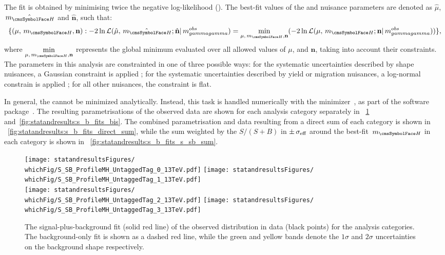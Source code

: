 The fit is obtained by minimising twice the negative log-likelihood (\NLL). 
The best-fit values of the \POI\s and nuisance parameters are denoted as $\hat{\mu}$, $\hat{\mH}$ and $\hat{\mathbf{n}}$, such that:
\begin{equation}
\{ (\mu, \mH, \mathbf{n}) : -2 \ln \mathcal{L}(\hat{\mu}, \hat{\mH} ;\hat{\mathbf{n}}| \mgg^{obs}) = \min _{\mu,\mH , \mathbf{n}}(-2 \ln \mathcal{L}(\mu, \mH; \mathbf{n}| \mgg^{obs})) \},
\end{equation}
where $\displaystyle\min_{ \mu, \mH ,\mathbf{n}}$ represents the global minimum evaluated over all allowed values of $\mu$, \mH and $\mathbf{n}$, taking into account their constraints. The parameters in this analysis are constrainted in one of three possible ways: for the systematic uncertainties described by shape nuisances, a Gaussian constraint is applied ; for the systematic uncertainties described by yield or migration nuisances, a log-normal constrain is applied ; for all other nuisances, the constraint is flat. 

 In general, the \NLL cannot be minimized analytically. Instead, this task is handled numerically with the \Minuit minimizer~\cite{minuit}, as part of the \RooFit software package~\cite{RooFit}. 
The resulting parametrisations of the observed data are shown for each analysis category separately in \Fig\s~\ref{fig:statandresults:s_b_fits} and~\ref{fig:statandresults:s_b_fits_bis}. The combined parametrisation and data resulting from a direct sum of each category is shown in \Fig~\ref{fig:statandresults:s_b_fits_direct_sum}, while the sum weighted by the $S/(S+B)$ in $\pm \,\sigma_{\text{eff}}$ around the best-fit $\mH$ in each category is shown in \Fig~\ref{fig:statandresults:s_b_fits_s_sb_sum}. 

\begin{figure}[p]
\centering
\texttt{[image: statandresultsFigures/\\whichFig/S\_SB\_ProfileMH\_UntaggedTag\_0\_13TeV.pdf]} 
\texttt{[image: statandresultsFigures/\\whichFig/S\_SB\_ProfileMH\_UntaggedTag\_1\_13TeV.pdf]}\\ 
\texttt{[image: statandresultsFigures/\\whichFig/S\_SB\_ProfileMH\_UntaggedTag\_2\_13TeV.pdf]} 
\texttt{[image: statandresultsFigures/\\whichFig/S\_SB\_ProfileMH\_UntaggedTag\_3\_13TeV.pdf]} \\
\caption{The signal-plus-background fit (solid red line) of the observed \mgg distribution in data (black points) for the \Untagged analysis categories. The background-only fit is shown as a dashed red line, while the green and yellow bands denote the $1\sigma$ and $2\sigma$ uncertainties on the background shape respectively.}

\label{fig:statandresults:s_b_fits}
\end{figure}

